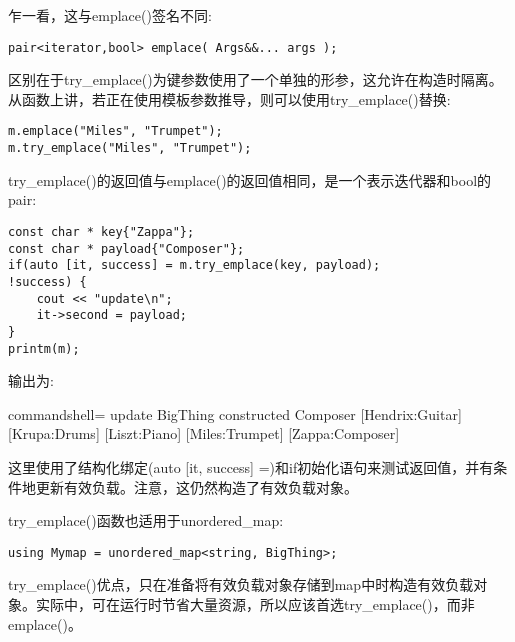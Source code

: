 乍一看，这与emplace()签名不同:

\begin{lstlisting}[style=styleCXX]
pair<iterator,bool> emplace( Args&&... args );
\end{lstlisting}

区别在于try\_emplace()为键参数使用了一个单独的形参，这允许在构造时隔离。从函数上讲，若正在使用模板参数推导，则可以使用try\_emplace()替换:

\begin{lstlisting}[style=styleCXX]
m.emplace("Miles", "Trumpet");
m.try_emplace("Miles", "Trumpet");
\end{lstlisting}

try\_emplace()的返回值与emplace()的返回值相同，是一个表示迭代器和bool的pair:

\begin{lstlisting}[style=styleCXX]
const char * key{"Zappa"};
const char * payload{"Composer"};
if(auto [it, success] = m.try_emplace(key, payload);
!success) {
	cout << "update\n";
	it->second = payload;
}
printm(m);
\end{lstlisting}

输出为:

\begin{tcblisting}{commandshell={}}
update
BigThing constructed Composer
[Hendrix:Guitar] [Krupa:Drums] [Liszt:Piano] [Miles:Trumpet]
[Zappa:Composer]
\end{tcblisting}

这里使用了结构化绑定(auto [it, success] =)和if初始化语句来测试返回值，并有条件地更新有效负载。注意，这仍然构造了有效负载对象。

try\_emplace()函数也适用于unordered\_map:

\begin{lstlisting}[style=styleCXX]
using Mymap = unordered_map<string, BigThing>;
\end{lstlisting}

try\_emplace()优点，只在准备将有效负载对象存储到map中时构造有效负载对象。实际中，可在运行时节省大量资源，所以应该首选try\_emplace()，而非emplace()。




















